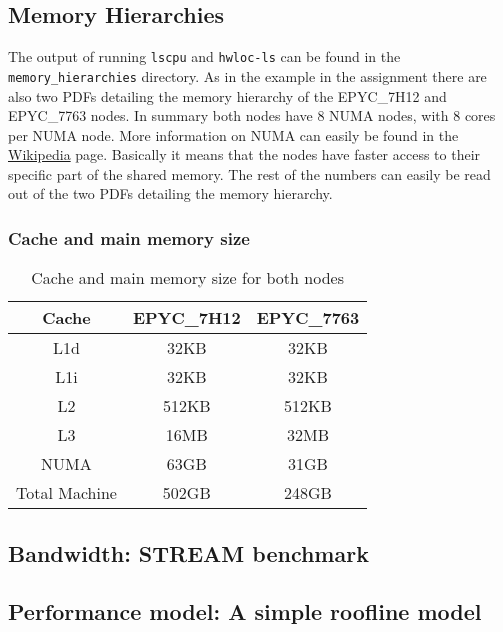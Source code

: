 \documentclass[unicode,11pt,a4paper,oneside,numbers=endperiod,openany]{scrartcl}
\begin{document}
\subsection{Memory Hierarchies}

The output of running \texttt{lscpu} and \texttt{hwloc-ls} can be found in the \texttt{memory\_hierarchies} directory. As in the example in the assignment there are also two PDFs detailing the memory hierarchy of the EPYC\_7H12 and EPYC\_7763 nodes. In summary both nodes have 8 NUMA nodes, with 8 cores per NUMA node. More information on NUMA can easily be found in the \href{https://en.wikipedia.org/wiki/Non-uniform_memory_access}{Wikipedia} page. Basically it means that the nodes have faster access to their specific part of the shared memory. The rest of the numbers can easily be read out of the two PDFs detailing the memory hierarchy.

\subsubsection{Cache and main memory size}


\begin{table}[h]
    \centering
    \begin{tabular}{|c|c|c|}
        \hline

        \textbf{Cache} & \textbf{EPYC\_7H12} & \textbf{EPYC\_7763} \\
        \hline
        L1d            & 32KB                & 32KB                \\
        \hline
        L1i            & 32KB                & 32KB                \\
        \hline
        L2             & 512KB               & 512KB               \\
        \hline
        L3             & 16MB                & 32MB                \\
        \hline
        NUMA           & 63GB                & 31GB                \\
        \hline
        Total Machine  & 502GB               & 248GB               \\
        \hline
    \end{tabular}
    \caption{Cache and main memory size for both nodes}
    \label{tab:cache_main_memory}
\end{table}

\subsection{Bandwidth: STREAM benchmark}

\subsection{Performance model: A simple roofline model}
\end{document}
